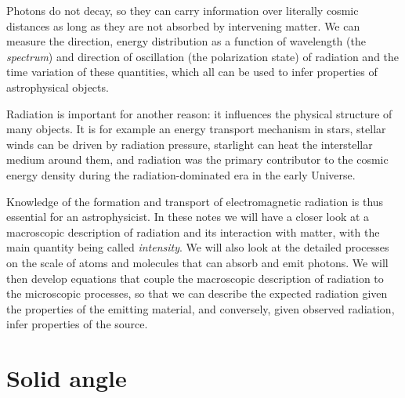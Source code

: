 \documentclass[12pt]{article}
\numberwithin{equation}{section}
\begin{document}
Photons do not decay, so they can carry information over literally cosmic distances as long as they are not absorbed by intervening matter. We can measure the direction, energy distribution as a function of wavelength (the {\it spectrum}) and direction of oscillation (the polarization state) of radiation and the time variation of these quantities, which all can be used to infer properties of astrophysical objects. 

Radiation is important for another reason: it influences the physical structure of many objects. It is for example an energy transport mechanism in stars, stellar winds can be driven by radiation pressure, starlight can heat the interstellar medium around them, and radiation was the primary contributor to the cosmic energy density during the radiation-dominated era in the early Universe.

Knowledge of the formation and transport of electromagnetic radiation is thus essential for an astrophysicist. In these notes we will have a closer look at a macroscopic description of radiation and its interaction with matter, with the main quantity being called {\it intensity}. We will also look at the detailed processes on the scale of atoms and molecules that can absorb and emit photons. We will then develop equations that couple the macroscopic description of radiation to the microscopic processes, so that we can describe the expected radiation given the properties of the emitting material, and conversely, given observed radiation, infer properties of the source.

\newpage
\section{Solid angle}
\end{document}
